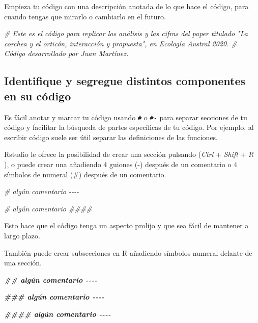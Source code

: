 \documentclass[
]{book}
\newenvironment{Shaded}{\begin{snugshade}}{\end{snugshade}}
\newcommand{\CommentTok}[1]{\textcolor[rgb]{0.56,0.35,0.01}{\textit{#1}}}
\newcommand{\DocumentationTok}[1]{\textcolor[rgb]{0.56,0.35,0.01}{\textbf{\textit{#1}}}}
\begin{document}
Empieza tu código con una descripción anotada de lo que hace el código, para cuando tengas que mirarlo o cambiarlo en el futuro.

\begin{Shaded}
\begin{Highlighting}[]
\CommentTok{\# Este es el código para replicar los análisis y las cifras del  paper titulado "La corchea y el orticón, interacción y propuesta", en Ecología Austral 2020.}
\CommentTok{\# Código desarrollado por Juan Martínez.}
\end{Highlighting}
\end{Shaded}

\hypertarget{identifique-y-segregue-distintos-componentes-en-su-cuxf3digo}{%
\subsection{\texorpdfstring{\textbf{Identifique y segregue distintos componentes en su código}}{Identifique y segregue distintos componentes en su código}}\label{identifique-y-segregue-distintos-componentes-en-su-cuxf3digo}}

Es fácil anotar y marcar tu código usando \texttt{\#} o \texttt{\#-} para separar secciones de tu código y facilitar la búsqueda de partes específicas de tu código. Por ejemplo, al escribir código suele ser útil separar las definiciones de las funciones.

Rstudio le ofrece la posibilidad de crear una sección pulsando (\emph{Ctrl} + \emph{Shift} + \emph{R} ), o puede crear una añadiendo 4 guiones (-) después de un comentario o 4 símbolos de numeral (\#) después de un comentario.

\begin{Shaded}
\begin{Highlighting}[]
\CommentTok{\# algún comentario {-}{-}{-}{-}}

\CommentTok{\# algún comentario \#\#\#\#}
\end{Highlighting}
\end{Shaded}

Esto hace que el código tenga un aspecto prolijo y que sea fácil de mantener a largo plazo.

También puede crear subsecciones en R añadiendo símbolos numeral delante de una sección.

\begin{Shaded}
\begin{Highlighting}[]
\DocumentationTok{\#\# algún comentario {-}{-}{-}{-}}

\DocumentationTok{\#\#\# algún comentario {-}{-}{-}{-}}

\DocumentationTok{\#\#\#\# algún comentario {-}{-}{-}{-}}
\end{Highlighting}
\end{Shaded}
\end{document}
